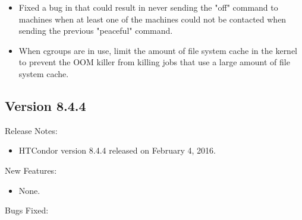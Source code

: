 \begin{itemize}
\item Fixed a bug in   that could result in never
sending the "off" command to machines when at least one of the machines could
not be contacted when sending the previous "peaceful" command.

\item When cgroups are in use, limit the amount of file system cache in the
kernel to prevent the OOM killer from killing jobs that use a large amount of
file system cache.

\end{itemize}

\subsection*{\label{sec:New-8-4-4}Version 8.4.4}

\noindent Release Notes:

\begin{itemize}

\item HTCondor version 8.4.4 released on February 4, 2016.

\end{itemize}


\noindent New Features:

\begin{itemize}

\item None.

\end{itemize}

\noindent Bugs Fixed:

